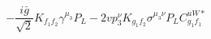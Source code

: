 %
\begin{dmath*}
%
  -  \frac{i {\bar g}{}}{\sqrt{2}}K_{f_1 f_2}  \gamma^{\mu_3} P_L  -  2 v p_3^{\nu} K_{g_1 f_2} \sigma^{\mu_3 \nu } P_L  C^{uW*}_{g_1 f_1}
%
\end{dmath*}
%
